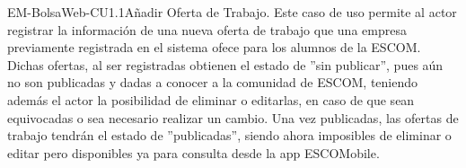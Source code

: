 	\begin{UseCase}{EM-BolsaWeb-CU1.1}{Añadir Oferta de Trabajo.}{
		\noindent
		Este caso de uso permite al actor registrar la información de una nueva oferta de trabajo que una empresa previamente registrada en el sistema ofece para los alumnos de la ESCOM. Dichas ofertas, al ser registradas obtienen el estado de ''sin publicar'', pues aún no son publicadas y dadas a conocer a la comunidad de ESCOM, teniendo además el actor la posibilidad de eliminar o editarlas, en caso de que sean equivocadas o sea necesario realizar un cambio. Una vez publicadas, las ofertas de trabajo tendrán el estado de ''publicadas'', siendo ahora imposibles de eliminar o editar pero disponibles ya para consulta desde la app ESCOMobile. 
		\newline
		}
\end{UseCase}
